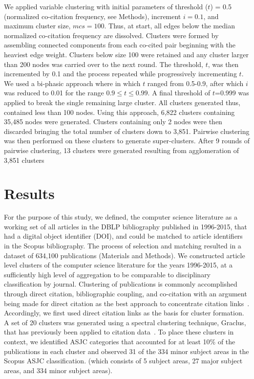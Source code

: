 We applied variable clustering with initial parameters of threshold ($t$) = 0.5 (normalized co-citation frequency, see Methods), increment $i = 0.1$, and maximum cluster size, $mcs = 100$. Thus, at start, all edges below the median normalized co-citation frequency are dissolved. Clusters were formed by assembling connected components from each co-cited pair beginning with the heaviest edge weight. Clusters below size 100 were retained and any cluster larger than 200 nodes was carried over to the next round. The threshold, $t$, was then incremented by 0.1 and the process repeated while progressively incrementing $t$.  We used a bi-phasic approach where in which $t$ ranged from 0.5-0.9, after which $i$ was reduced to 0.01 for the range $0.9 \leq t \leq 0.99$. A final threshold of $t$=0.999 was applied to break the single remaining large cluster. All clusters generated thus, contained  less than 100 nodes.  Using this approach, 6,822 clusters containing 35,485 nodes were generated. Clusters containing only 2 nodes were then discarded bringing the total number of clusters down to 3,851. Pairwise clustering was then performed on these clusters to generate super-clusters. After 9 rounds of pairwise clustering, 13 clusters were generated resulting from agglomeration of 3,851 clusters 


\section{Results}
\label{sec:results}

For the purpose of this study, we defined, the computer science literature as a working set of all articles in the DBLP bibliography published in 1996-2015, that had a digital object identifier (DOI), and could be matched to article identifiers in the Scopus bibliography. The process of selection and matching resulted in a dataset of 634,100 publications (Materials and Methods). We constructed article level clusters of the computer science literature for the years 1996-2015, at a sufficiently high level of aggregation to be comparable to disciplinary classification by journal. Clustering of publications is commonly accomplished through direct citation, bibliographic coupling, and co-citation with an argument being made for direct citation as the best approach to concentrate citation links~\cite{klavans_which_2017}. Accordingly, we first used direct citation links as the basis for cluster formation. A set of 20 clusters was generated using a spectral clustering technique, Graclus, that has previously been applied to citation data~\cite{graclus_2007,subelj_clustering_2016}. To place these clusters in context, we identified ASJC categories that accounted for at least 10\% of the publications in each cluster and observed 31 of the 334 minor subject areas in the Scopus ASJC classification. (which consists of 5 subject areas, 27 major subject areas, and 334 minor subject areas). 

